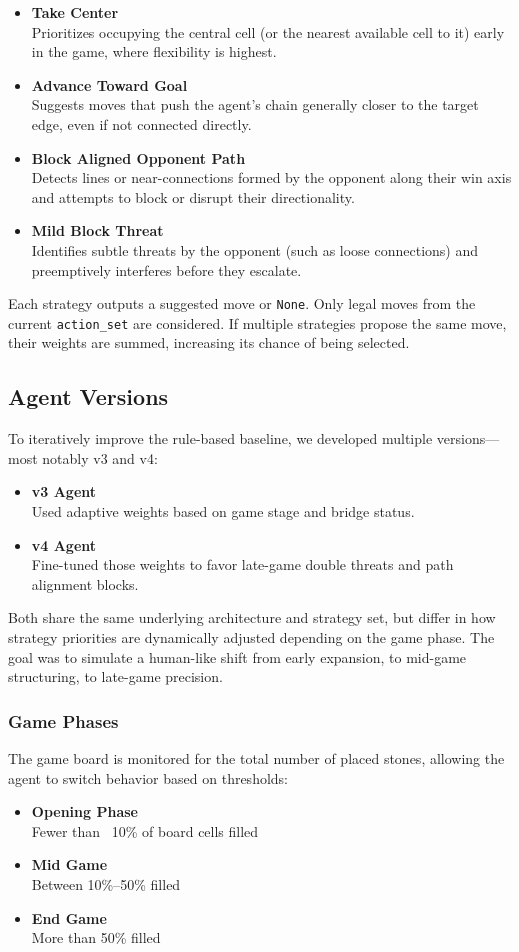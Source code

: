 \documentclass[conference]{IEEEtran}
\begin{document}
\begin{itemize}[]
\item \textbf{Take Center} \\
Prioritizes occupying the central cell (or the nearest available cell to it) early in the game, where flexibility is highest.
\item \textbf{Advance Toward Goal} \\
Suggests moves that push the agent’s chain generally closer to the target edge, even if not connected directly.
\item \textbf{Block Aligned Opponent Path} \\
Detects lines or near-connections formed by the opponent along their win axis and attempts to block or disrupt their directionality.
\item \textbf{Mild Block Threat} \\
Identifies subtle threats by the opponent (such as loose connections) and preemptively interferes before they escalate.
\end{itemize}
Each strategy outputs a suggested move or \texttt{None}. Only legal moves from the current \texttt{action\_set} are considered. If multiple strategies propose the same move, their weights are summed, increasing its chance of being selected.

\subsection{Agent Versions}\label{AV}
To iteratively improve the rule-based baseline, we developed multiple versions—most notably v3 and v4: 
\begin{itemize}[]
\item \textbf{v3 Agent} \\
Used adaptive weights based on game stage and bridge status.
\item \textbf{v4 Agent} \\
Fine-tuned those weights to favor late-game double threats and path alignment blocks.
\end{itemize}
Both share the same underlying architecture and strategy set, but differ in how strategy priorities are dynamically adjusted depending on the game phase. The goal was to simulate a human-like shift from early expansion, to mid-game structuring, to late-game precision.

\subsubsection{Game Phases}
The game board is monitored for the total number of placed stones, allowing the agent to switch behavior based on thresholds:
\begin{itemize}[]
\item \textbf{Opening Phase} \\
Fewer than ~10\% of board cells filled
\item \textbf{Mid Game} \\
Between 10\%–50\% filled
\item \textbf{End Game} \\
More than 50\% filled
\end{itemize}
\end{document}
